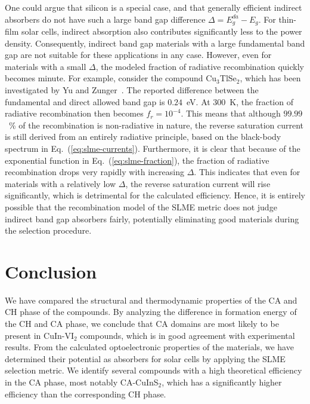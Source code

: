 \begin{refsection}
One could argue that silicon is a special case, and that generally efficient 
indirect absorbers do not have such a large band gap difference \mbox{$\Delta 
= E_g ^{da}- E_g$}. For thin-film solar cells, indirect absorption also 
contributes significantly less to the power density. Consequently, indirect 
band gap materials with a large fundamental band gap are not suitable for 
these applications in any case. However, even for materials with a small 
$\Delta$, the modeled fraction of radiative recombination quickly becomes 
minute. For example, consider the compound Cu$_3$TlSe$_2$, which has been 
investigated by Yu and Zunger~\cite{Yu2012}. The reported difference between 
the fundamental and direct allowed band gap is $0.24$~\si{\electronvolt}. At 
300~\si{\kelvin}, the fraction of radiative recombination then becomes 
\mbox{$f_r = 10^{-4}$}. This means that although $99.99$~\% of the 
recombination is non-radiative in nature, the reverse saturation current is 
still derived from an entirely radiative principle, based on the black-body 
spectrum in Eq.~(\ref{eq:slme-currents}). Furthermore, it is clear that 
because of the exponential function in Eq.~(\ref{eq:slme-fraction}), the 
fraction of radiative recombination drops very rapidly with increasing 
$\Delta$. This indicates that even for materials with a relatively low 
$\Delta$, the reverse saturation current will rise significantly, which is 
detrimental for the calculated efficiency. Hence, it is entirely possible that 
the recombination model of the SLME metric does not judge indirect band gap 
absorbers fairly, potentially eliminating good materials during the selection 
procedure.\\ 
 
\section{Conclusion} 
 
We have compared the structural and thermodynamic properties of the CA and CH 
phase of the compounds. By analyzing the difference in formation energy of the 
CH and CA phase, we conclude that CA domains are most likely to be present in 
\mbox{CuIn-VI$_2$} compounds, which is in good agreement with experimental 
results. From the calculated optoelectronic properties of the materials, we 
have determined their potential as absorbers for solar cells by applying the 
SLME selection metric. We identify several compounds with a high theoretical 
efficiency in the CA phase, most notably \mbox{CA-CuInS$_2$}, which has a 
significantly higher efficiency than the corresponding CH phase. 
 

\end{refsection}
